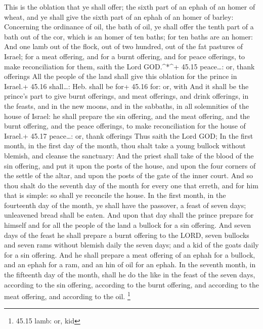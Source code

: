  This is the oblation that ye shall offer; the sixth part
of an ephah of an homer of wheat, and ye shall give the sixth part of an
ephah of an homer of barley:  Concerning the ordinance of
oil, the bath of oil, ye shall offer the tenth part of a bath out of the
cor, which is an homer of ten baths; for ten baths are an homer:
 And one lamb out of the flock, out of two hundred, out of
the fat pastures of Israel; for a meat offering, and for a burnt
offering, and for peace offerings, to make reconciliation for them,
saith the Lord GOD.\^{}*\^{}+ 45.15 peace\ldots: or, thank offerings
 All the people of the land shall give this oblation for
the prince in Israel.+ 45.16 shall\ldots: Heb. shall be for+ 45.16 for:
or, with  And it shall be the prince's part to give burnt
offerings, and meat offerings, and drink offerings, in the feasts, and
in the new moons, and in the sabbaths, in all solemnities of the house
of Israel: he shall prepare the sin offering, and the meat offering, and
the burnt offering, and the peace offerings, to make reconciliation for
the house of Israel.+ 45.17 peace\ldots: or, thank offerings
 Thus saith the Lord GOD; In the first month, in the first
day of the month, thou shalt take a young bullock without blemish, and
cleanse the sanctuary:  And the priest shall take of the
blood of the sin offering, and put it upon the posts of the house, and
upon the four corners of the settle of the altar, and upon the posts of
the gate of the inner court.  And so thou shalt do the
seventh day of the month for every one that erreth, and for him that is
simple: so shall ye reconcile the house.  In the first
month, in the fourteenth day of the month, ye shall have the passover, a
feast of seven days; unleavened bread shall be eaten.  And
upon that day shall the prince prepare for himself and for all the
people of the land a bullock for a sin offering.  And seven
days of the feast he shall prepare a burnt offering to the LORD, seven
bullocks and seven rams without blemish daily the seven days; and a kid
of the goats daily for a sin offering.  And he shall
prepare a meat offering of an ephah for a bullock, and an ephah for a
ram, and an hin of oil for an ephah.  In the seventh month,
in the fifteenth day of the month, shall he do the like in the feast of
the seven days, according to the sin offering, according to the burnt
offering, and according to the meat offering, and according to the oil.
\footnote{45.15 lamb: or, kid}

